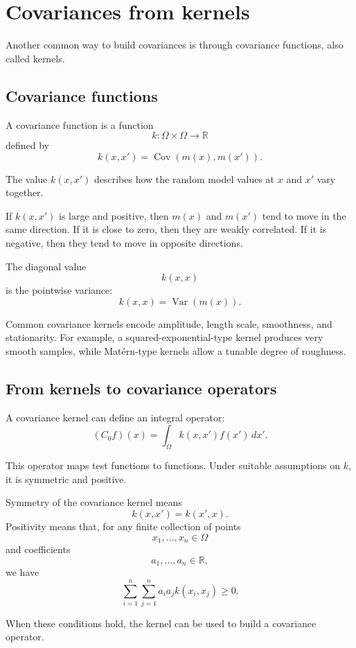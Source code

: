\documentclass[11pt,a4paper]{book}
\newcommand{\R}{\mathbb{R}}
\newcommand{\Cov}{\operatorname{Cov}}
\begin{document}
\section{Covariances from kernels}

Another common way to build covariances is through covariance functions, also
called kernels.

\subsection{Covariance functions}

A covariance function is a function
\[
    k:\Omega\times\Omega\to\R
\]
defined by
\[
    k(x,x')
    =
    \Cov(m(x),m(x')).
\]

The value $k(x,x')$ describes how the random model values at $x$ and $x'$ vary
together.

If $k(x,x')$ is large and positive, then $m(x)$ and $m(x')$ tend to move in the
same direction. If it is close to zero, then they are weakly correlated. If it
is negative, then they tend to move in opposite directions.

The diagonal value
\[
    k(x,x)
\]
is the pointwise variance:
\[
    k(x,x)
    =
    \operatorname{Var}(m(x)).
\]

Common covariance kernels encode amplitude, length scale, smoothness, and
stationarity. For example, a squared-exponential-type kernel produces very
smooth samples, while Matérn-type kernels allow a tunable degree of roughness.

\subsection{From kernels to covariance operators}

A covariance kernel can define an integral operator:
\[
    (C_0 f)(x)
    =
    \int_\Omega k(x,x')f(x')\,dx'.
\]

This operator maps test functions to functions. Under suitable assumptions on
$k$, it is symmetric and positive.

Symmetry of the covariance kernel means
\[
    k(x,x')=k(x',x).
\]
Positivity means that, for any finite collection of points
\[
    x_1,\ldots,x_n\in\Omega
\]
and coefficients
\[
    a_1,\ldots,a_n\in\R,
\]
we have
\[
    \sum_{i=1}^n\sum_{j=1}^n
    a_i a_j k(x_i,x_j)
    \geq 0.
\]

When these conditions hold, the kernel can be used to build a covariance
operator.
\end{document}
